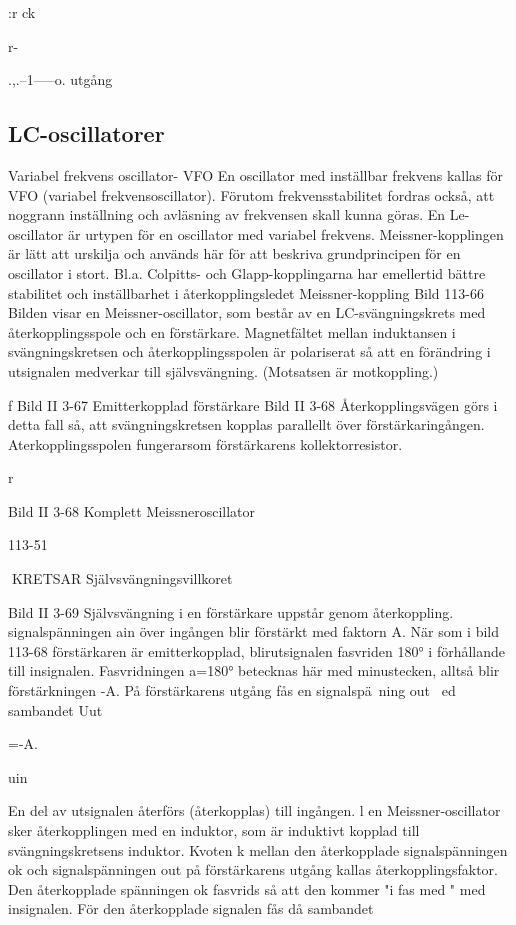 {:r
ck

r-

.,.--1-----o.
utgång

\subsection{LC-oscillatorer}
Variabel frekvens oscillator- VFO
En oscillator med inställbar frekvens kallas
för VFO (variabel frekvensoscillator). Förutom frekvensstabilitet fordras också, att
noggrann inställning och avläsning av frekvensen skall kunna göras.
En Le-oscillator är urtypen för en oscillator med variabel frekvens. Meissner-kopplingen är lätt att urskilja och används här för
att beskriva grundprincipen för en oscillator
i stort. Bl.a. Colpitts- och Glapp-kopplingarna har emellertid bättre stabilitet och
inställbarhet i återkopplingsledet
Meissner-koppling
Bild 113-66
Bilden visar en Meissner-oscillator, som består av en LC-svängningskrets med återkopplingsspole och en förstärkare. Magnetfältet mellan induktansen i svängningskretsen och återkopplingsspolen är polariserat
så att en förändring i utsignalen medverkar
till självsvängning. (Motsatsen är motkoppling.)

f
Bild II 3-67 Emitterkopplad förstärkare
Bild II 3-68
Återkopplingsvägen görs i detta fall så, att
svängningskretsen kopplas parallellt över
förstärkaringången. Aterkopplingsspolen
fungerarsom förstärkarens kollektorresistor.

r

Bild II 3-68 Komplett Meissneroscillator

113-51

KRETSAR
Självsvängningsvillkoret

Bild II 3-69
Självsvängning i en förstärkare uppstår genom återkoppling. signalspänningen ain över
ingången blir förstärkt med faktorn A. När
som i bild 113-68 förstärkaren är emitterkopplad, blirutsignalen fasvriden 180° i förhållande till insignalen. Fasvridningen a=180° betecknas här med minustecken, alltså blir
förstärkningen -A.
På förstärkarens utgång fås en signalspä~ning out ~ed sambandet
Uut

=-A.

uin

En del av utsignalen återförs (återkopplas) till ingången. l en Meissner-oscillator
sker återkopplingen med en induktor, som är
induktivt kopplad till svängningskretsens induktor.
Kvoten k mellan den återkopplade signalspänningen ok och signalspänningen out
på förstärkarens utgång kallas återkopplingsfaktor. Den återkopplade spänningen
ok fasvrids så att den kommer "i fas med "
med insignalen. För den återkopplade signalen fås då sambandet

}
